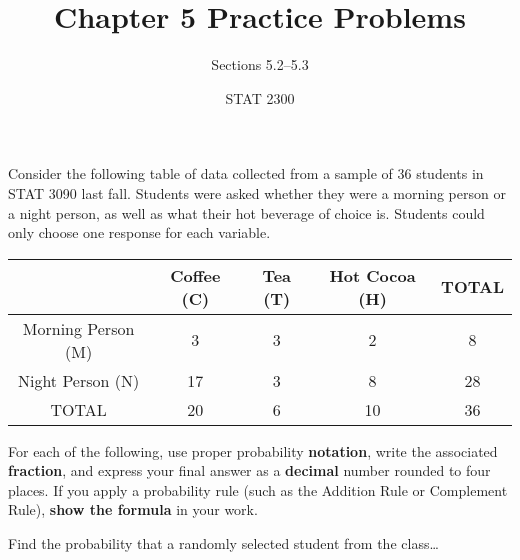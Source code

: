 \documentclass[noanswers]{exam}
\title{Chapter 5 Practice Problems}
\author{Sections 5.2--5.3}
\date{STAT 2300}
\begin{document}
%

\begin{questions} 
	
	\vspace{3mm}
	
	\question Consider the following table of data collected from a sample of 36 students in STAT 3090 last fall. Students were asked whether they were a morning person or a night person, as well as what their hot beverage of choice is. Students could only choose one response for each variable.
	
	\begin{center}
\begin{tabular}{|c|c|c|c|c|}
\hline
 & \hspace{3mm} Coffee (C) \hspace{3mm} & \hspace{4mm} Tea (T) \hspace{4mm} & Hot Cocoa (H) & TOTAL\\
 \hline
 Morning Person (M) & 3 & 3 & 2 & 8 \\
 \hline
 Night Person (N) & 17 & 3 & 8 & 28 \\
\hline
TOTAL & 20 & 6 & 10 & 36 \\
\hline
\end{tabular}
\end{center}

For each of the following, use proper probability \textbf{notation}, write the associated \textbf{fraction}, and express your final answer as a \textbf{decimal} number rounded to four places. If you apply a probability rule (such as the Addition Rule or Complement Rule), \textbf{show the formula} in your work. 

\vspace{3mm}

Find the probability that a randomly selected student from the class\dots 

\end{questions}
\end{document}

